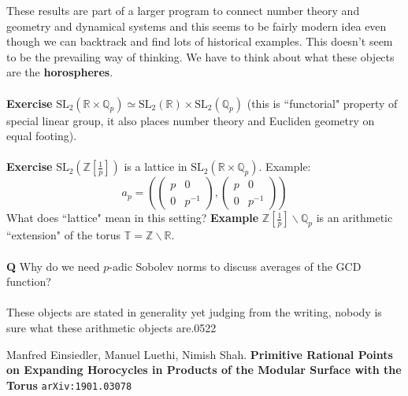 \documentclass[12pt]{article}
\begin{document}
{These results are part of a larger program to connect number theory and geometry and dynamical systems and this seems to be fairly modern idea even though we can backtrack and find lots of historical examples.  This doesn't seem to be the prevailing way of thinking.  We have to think about what these objects are the \textbf{horospheres}. \\ \\
\textbf{Exercise} $\text{SL}_2(\mathbb{R} \times \mathbb{Q}_p) \simeq \text{SL}_2(\mathbb{R}) \times \text{SL}_2(\mathbb{Q}_p) $ (this is ``functorial" property of special linear group, it also places number theory and Eucliden geometry on equal footing). \\ \\
\textbf{Exercise} $\text{SL}_2(\mathbb{Z}[\frac{1}{p}]) $ is a lattice in $\text{SL}_2(\mathbb{R} \times \mathbb{Q}_p)$.  Example:
$$ a_p = \left( \left(\begin{array}{cc} p & 0 \\ 0 & p^{-1} \end{array} \right), \left(\begin{array}{cc} p & 0 \\ 0 & p^{-1} \end{array} \right)\right) $$
What does ``lattice" mean in this setting?
\newpage
\noindent \textbf{Example} $\mathbb{Z}[\frac{1}{p}] \backslash \mathbb{Q}_p$  is an arithmetic ``extension" of the torus $\mathbb{T} = \mathbb{Z} \backslash \mathbb{R} $. \\ \\
\textbf{Q} Why do we need $p$-adic Sobolev norms to discuss averages of the GCD function? \\ \\
These objects are stated in generality yet judging from the writing, nobody is sure what these arithmetic objects are.0522
}
\vfill

\begin{thebibliography}{}

\item Manfred Einsiedler, Manuel Luethi, Nimish Shah. \textbf{Primitive Rational Points on Expanding Horocycles in Products of the Modular Surface with the Torus} \texttt{arXiv:1901.03078}

\item 

\end{thebibliography}
\end{document}
